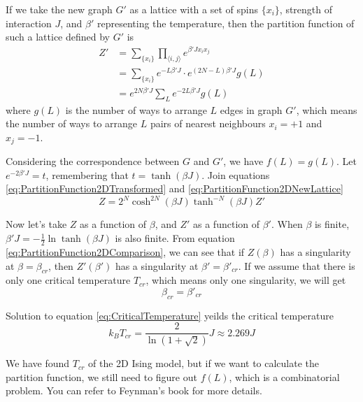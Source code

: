 \documentclass[11pt]{article}
\begin{document}
	If we take the new graph $G'$ as a lattice with a set of spins $\{x_i\}$, strength of interaction $J$, and $\beta'$ representing the temperature, then the partition function of such a lattice defined by $G'$ is
	\begin{equation} \label{eq:PartitionFunction2DNewLattice}
		\begin{aligned}
			Z' &= \sum_{\{x_i\}} \prod_{\langle i,j \rangle} e^{\beta' J x_i x_j} \\
			&= \sum_{\{x_i\}} e^{-L\beta' J} \cdot e^{(2N-L)\beta' J} g(L) \\
			&= e^{2N\beta' J} \sum_{L} e^{-2L\beta' J} g(L)
		\end{aligned}
	\end{equation}
	where $g(L)$ is the number of ways to arrange $L$ edges in graph $G'$, which means the number of ways to arrange $L$ pairs of nearest neighbours $x_i=+1$ and $x_j=-1$.
	
	Considering the correspondence between $G$ and $G'$, we have $f(L) = g(L)$. Let $e^{-2\beta' J} = t$, remembering that $t = \tanh(\beta J)$. Join equations \eqref{eq:PartitionFunction2DTransformed} and \eqref{eq:PartitionFunction2DNewLattice}
	\begin{equation} \label{eq:PartitionFunction2DComparison}
		Z = 2^N \cosh^{2N}(\beta J) \tanh^{-N}(\beta J) Z'
	\end{equation}

	Now let's take $Z$ as a function of $\beta$, and $Z'$ as a function of $\beta'$. When $\beta$ is finite, $\beta' J = -\frac12 \ln{\tanh(\beta J)}$ is also finite. From equation \eqref{eq:PartitionFunction2DComparison}, we can see that if $Z(\beta)$ has a singularity at $\beta = \beta_{cr}$, then $Z'(\beta')$ has a singularity at $\beta' = \beta'_{cr}$.
	If we assume that there is only one critical temperature $T_{cr}$, which means only one singularity, we will get
	\begin{equation} \label{eq:Singularity}
		\beta_{cr} = \beta'_{cr}
	\end{equation}

	Solution to equation \eqref{eq:CriticalTemperature} yeilds the critical temperature
	\begin{equation} \label{eq:CriticalTemperature}
		k_B T_{cr} = \frac{2}{\ln(1+\sqrt{2})}J \approx 2.269J
	\end{equation}

	We have found $T_{cr}$ of the 2D Ising model, but if we want to calculate the partition function, we still need to figure out $f(L)$, which is a combinatorial problem. You can refer to Feynman's book\cite{feynman1972statistical} for more details.
\end{document}
